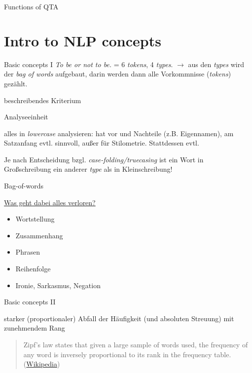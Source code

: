 \documentclass[10pt,a4paper]{article}
\begin{document}
\begin{multicols}{3}
\begin{textbox}{Functions of QTA}
\end{textbox}





\section{Intro to NLP concepts}

\begin{textbox}{Basic concepts I}
\emph{To be or not to be.} = 6 \emph{tokens}, 4 \emph{types}.
$\to$ aus den \emph{types} wird der \emph{bag of words} aufgebaut, darin werden dann alle Vorkommnisse (\emph{tokens}) gezählt.

 beschreibendes Kriterium

 Analyseeinheit

 alles in \emph{lowercase} analysieren: hat vor und Nachteile (z.B. Eigennamen), am Satzanfang evtl. sinnvoll, außer für Stilometrie. Stattdessen evtl.

Je nach Entscheidung bzgl. \emph{case-folding/truecasing} ist ein Wort in Großschreibung ein anderer \emph{type} als in Kleinschreibung!
\end{textbox}

\begin{textbox}{Bag-of-words}

\underline{Was geht dabei alles verloren?}
\begin{itemize}
    \item Wortstellung
    \item Zusammenhang
    \item Phrasen
    \item Reihenfolge
    \item Ironie, Sarkasmus, Negation
\end{itemize}
\end{textbox}

\begin{textbox}{Basic concepts II}

 starker (proportionaler) Abfall der Häufigkeit (und absoluten Streuung) mit zunehmendem Rang 
\begin{quote}
Zipf's law states that given a large sample of words used, the frequency of any word is inversely proportional to its rank in the frequency table. (\href{https://simple.wikipedia.org/wiki/Zipf%27s_law}{Wikipedia})
\end{quote}


\end{textbox}
\end{multicols}
\end{document}
